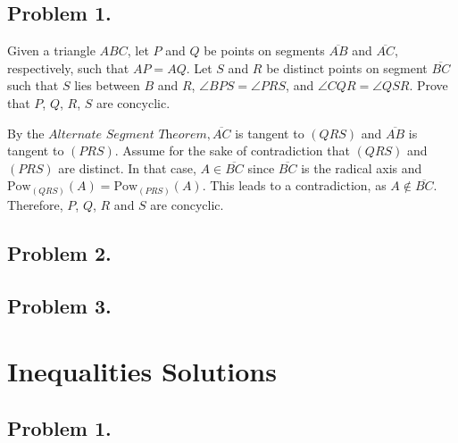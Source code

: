 \documentclass[12pt]{article}
\begin{document}
    \subsection{Problem 1.}
      \begin{tcolorbox}[problembox=Problem statement]
        Given a triangle $ABC$, let $P$ and $Q$ be points on segments $\overline{AB}$ and $\overline{AC}$,
        respectively, such that $AP = AQ$. Let $S$ and $R$ be distinct points on segment $\overline{BC}$
        such that $S$ lies between $B$ and $R$, $\angle BPS = \angle PRS$, and $\angle CQR = \angle QSR$.
        Prove that $P$, $Q$, $R$, $S$ are concyclic.
      \end{tcolorbox}
      By the $\textit{Alternate Segment Theorem}, \overline{AC}$ is tangent to $(QRS)$ and $\overline{AB}$
      is tangent to $(PRS)$. Assume for the sake of contradiction that $(QRS)$ and $(PRS)$ are distinct. In that case,
      $A \in \overline{BC}$ since $\overline{BC}$ is the radical axis and $\text{Pow}_{(QRS)}(A) =
      \text{Pow}_{(PRS)}(A)$. This leads to a contradiction, as $A \notin \overline{BC}$. Therefore,
      $P$, $Q$, $R$ and $S$ are concyclic.

    \clearpage

    \subsection{Problem 2.}
      \begin{tcolorbox}[problembox]
      \end{tcolorbox}

    \clearpage

    \subsection{Problem 3.}
      \begin{tcolorbox}[problembox]
      \end{tcolorbox}

  \clearpage

  \section{\textsf{Inequalities Solutions}}
    \subsection{Problem 1.}

    \clearpage
\end{document}
